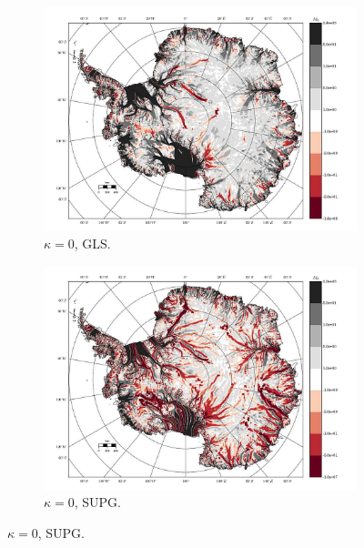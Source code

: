 \begin{figure}
  \label{antarctica_bv_image_U_ob_misfit}

\end{figure}


\begin{figure}

  \centering

  \begin{subfigure}[b]{0.45\linewidth}
    \includegraphics[width=\linewidth]{images/balance_velocity/antarctica/d_gS_m_U/misfit_10H_kappa_0_GLS.jpg}
  \caption{$\kappa = 0$, GLS.}
  \label{antarctica_bv_image_kappa_0_GLS_gS_m_U_misfit}
  \end{subfigure}
  \begin{subfigure}[b]{0.45\linewidth}
    \includegraphics[width=\linewidth]{images/balance_velocity/antarctica/d_gS_m_U/misfit_10H_kappa_0_SUPG.jpg}
  \caption{$\kappa = 0$, SUPG.}
  \label{antarctica_bv_image_kappa_0_SUPG_gS_m_U_misfit}
  \end{subfigure}


\end{figure}
